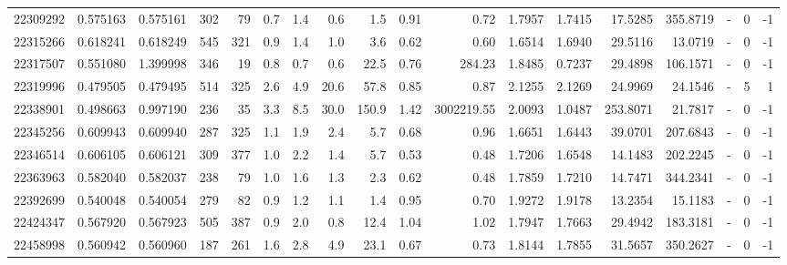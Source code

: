 \begin{tabular}{rrrrrrrrrrrrrrrlrr}
  22309292 & 0.575163 &   0.575161 &  302 &   79 &      0.7 &      1.4 &     0.6 &      1.5 &       0.91 &        0.72 &  1.7957 &  1.7415 &   17.5285 &  355.8719 &             - &        0 &         -1 \\
  22315266 & 0.618241 &   0.618249 &  545 &  321 &      0.9 &      1.4 &     1.0 &      3.6 &       0.62 &        0.60 &  1.6514 &  1.6940 &   29.5116 &   13.0719 &             - &        0 &         -1 \\
  22317507 & 0.551080 &   1.399998 &  346 &   19 &      0.8 &      0.7 &     0.6 &     22.5 &       0.76 &      284.23 &  1.8485 &  0.7237 &   29.4898 &  106.1571 &             - &        0 &         -1 \\
  22319996 & 0.479505 &   0.479495 &  514 &  325 &      2.6 &      4.9 &    20.6 &     57.8 &       0.85 &        0.87 &  2.1255 &  2.1269 &   24.9969 &   24.1546 &             - &        5 &          1 \\
  22338901 & 0.498663 &   0.997190 &  236 &   35 &      3.3 &      8.5 &    30.0 &    150.9 &       1.42 &  3002219.55 &  2.0093 &  1.0487 &  253.8071 &   21.7817 &             - &        0 &         -1 \\
  22345256 & 0.609943 &   0.609940 &  287 &  325 &      1.1 &      1.9 &     2.4 &      5.7 &       0.68 &        0.96 &  1.6651 &  1.6443 &   39.0701 &  207.6843 &             - &        0 &         -1 \\
  22346514 & 0.606105 &   0.606121 &  309 &  377 &      1.0 &      2.2 &     1.4 &      5.7 &       0.53 &        0.48 &  1.7206 &  1.6548 &   14.1483 &  202.2245 &             - &        0 &         -1 \\
  22363963 & 0.582040 &   0.582037 &  238 &   79 &      1.0 &      1.6 &     1.3 &      2.3 &       0.62 &        0.48 &  1.7859 &  1.7210 &   14.7471 &  344.2341 &             - &        0 &         -1 \\
  22392699 & 0.540048 &   0.540054 &  279 &   82 &      0.9 &      1.2 &     1.1 &      1.4 &       0.95 &        0.70 &  1.9272 &  1.9178 &   13.2354 &   15.1183 &             - &        0 &         -1 \\
  22424347 & 0.567920 &   0.567923 &  505 &  387 &      0.9 &      2.0 &     0.8 &     12.4 &       1.04 &        1.02 &  1.7947 &  1.7663 &   29.4942 &  183.3181 &             - &        0 &         -1 \\
  22458998 & 0.560942 &   0.560960 &  187 &  261 &      1.6 &      2.8 &     4.9 &     23.1 &       0.67 &        0.73 &  1.8144 &  1.7855 &   31.5657 &  350.2627 &             - &        0 &         -1 \\

\end{tabular}
